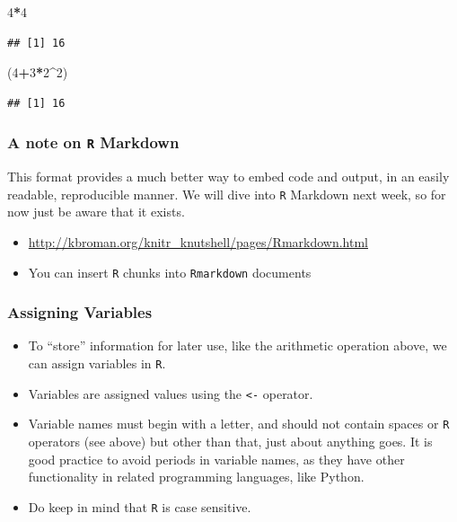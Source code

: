 \documentclass[]{book}
\newenvironment{Shaded}{\begin{snugshade}}{\end{snugshade}}
\newcommand{\DecValTok}[1]{\textcolor[rgb]{0.00,0.00,0.81}{#1}}
\newcommand{\NormalTok}[1]{#1}
\newcommand{\OperatorTok}[1]{\textcolor[rgb]{0.81,0.36,0.00}{\textbf{#1}}}
\begin{document}
\begin{Shaded}
\begin{Highlighting}[]
\DecValTok{4}\OperatorTok{*}\DecValTok{4}
\end{Highlighting}
\end{Shaded}

\begin{verbatim}
## [1] 16
\end{verbatim}

\begin{Shaded}
\begin{Highlighting}[]
\NormalTok{(}\DecValTok{4}\OperatorTok{+}\DecValTok{3}\OperatorTok{*}\DecValTok{2}\OperatorTok{^}\DecValTok{2}\NormalTok{)}
\end{Highlighting}
\end{Shaded}

\begin{verbatim}
## [1] 16
\end{verbatim}

\hypertarget{a-note-on-r-markdown}{%
\subsubsection{\texorpdfstring{A note on \texttt{R} Markdown}{A note on R Markdown}}\label{a-note-on-r-markdown}}

This format provides a much better way to embed code and output, in an easily readable, reproducible manner. We will dive into \texttt{R} Markdown next week, so for now just be aware that it exists.

\begin{itemize}
\item
  \url{http://kbroman.org/knitr_knutshell/pages/Rmarkdown.html}
\item
  You can insert \texttt{R} chunks into \texttt{Rmarkdown} documents
\end{itemize}

\hypertarget{assigning-variables}{%
\subsubsection{Assigning Variables}\label{assigning-variables}}

\begin{itemize}
\item
  To ``store'' information for later use, like the arithmetic operation above, we can assign variables in \texttt{R}.
\item
  Variables are assigned values using the \texttt{\textless{}-} operator.
\item
  Variable names must begin with a letter, and should not contain spaces or \texttt{R} operators (see above) but other than that, just about anything goes. It is good practice to avoid periods in variable names, as they have other functionality in related programming languages, like Python.
\item
  Do keep in mind that \texttt{R} is case sensitive.
\end{itemize}
\end{document}
